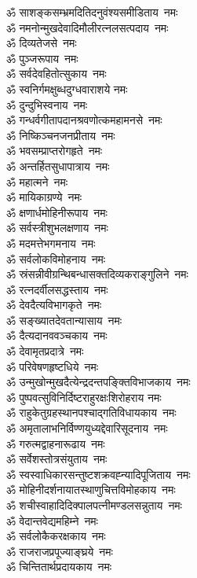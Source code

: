 \begin{multicols}{2}
\begin{flushleft}
ॐ साशङ्कसम्भ्रमदितिदनुवंश्य\-समीडिताय~नमः\\
ॐ नमनोन्मुखदेवादिमौलीरत्न\-लसत्पदाय~नमः\\
ॐ दिव्यतेजसे~नमः\\
ॐ पुञ्जरूपाय~नमः\\
ॐ सर्वदेवहितोत्सुकाय~नमः\\
ॐ स्वनिर्गमक्षुब्धदुग्धवाराशये नमः\hfill{}\\
ॐ दुन्दुभिस्वनाय~नमः\\
ॐ गन्धर्वगीतापदानश्रवणोत्क\-महामनसे~नमः\\
ॐ निष्किञ्चनजनप्रीताय~नमः\\
ॐ भवसम्प्राप्तरोगहृते~नमः\\
ॐ अन्तर्हितसुधापात्राय~नमः\\
ॐ महात्मने~नमः\\
ॐ मायिकाग्रण्ये~नमः\\
ॐ क्षणार्धमोहिनीरूपाय~नमः\\
ॐ सर्वस्त्रीशुभलक्षणाय~नमः\\
ॐ मदमत्तेभगमनाय~नमः\hfill{}\\
ॐ सर्वलोकविमोहनाय~नमः\\
ॐ स्रंसन्नीवीग्रन्थिबन्धासक्त\-दिव्यकराङ्गुलिने~नमः\\
ॐ रत्नदर्वीलसद्धस्ताय~नमः\\
ॐ देवदैत्यविभागकृते~नमः\\
ॐ सङ्ख्यातदेवतान्यासाय~नमः\\
ॐ दैत्यदानववञ्चकाय~नमः\\
ॐ देवामृतप्रदात्रे~नमः\\
ॐ परिवेषणहृष्टधिये~नमः\\
ॐ उन्मुखोन्मुखदैत्येन्द्रदन्त\-पङ्क्तिविभाजकाय~नमः\\
ॐ पुष्पवत्सुविनिर्दिष्टराहुरक्षः\-शिरोहराय नमः\hfill{}\\
ॐ राहुकेतुग्रहस्थानपश्चाद्गति\-विधायकाय~नमः\\
ॐ अमृतालाभनिर्विण्ण\-युध्यद्देवारि\-सूदनाय~नमः\\
ॐ गरुत्मद्वाहनारूढाय~नमः\\
ॐ सर्वेशस्तोत्रसंयुताय~नमः\\
ॐ स्वस्वाधिकारसन्तुष्ट\-शक्रवह्न्यादिपूजिताय~नमः\\
ॐ मोहिनीदर्शनायात\-स्थाणुचित्तविमोहकाय~नमः\\
ॐ शचीस्वाहादिदिक्पालपत्नी\-मण्डलसन्नुताय~नमः\\
ॐ वेदान्तवेद्यमहिम्ने~नमः\\
ॐ सर्वलोकैकरक्षकाय~नमः\\
ॐ राजराजप्रपूज्याङ्घ्रये~नमः\hfill{}\\
ॐ चिन्तितार्थप्रदायकाय~नमः\\
\end{flushleft}
\end{multicols}
  
